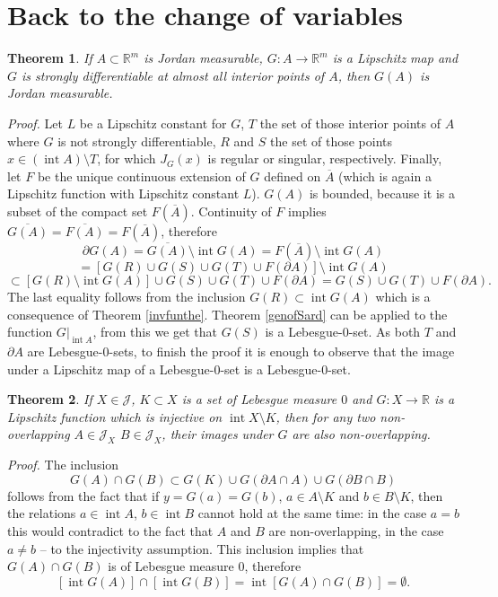 \documentclass{article}
\newcommand{\proof}[1]{\textit{Proof. }#1}
\newtheorem{theorem}{Theorem}
\newcommand{\ir}{\mathop{\mathrm{int}}\nolimits}
\newcommand{\R}{\ensuremath{\mathbb R}}
\newcommand{\J}{\mathscr{J}}
\newcommand{\ol}{\overline}
\begin{document}
\section{Back to the change of variables}

\begin{theorem} \label{imageJoLi}
If $ A\subset\R^m $ is Jordan measurable, $ G:A\to\R^m $ is a
Lipschitz map and $ G $ is strongly differentiable at almost all
interior points of $ A $, then $ G(A) $ is Jordan measurable.
\end{theorem}

\proof{ Let $ L $ be a Lipschitz constant for $ G $, $ T $ the set of
those interior points of $ A $ where $ G $ is not strongly
differentiable, $ R $ and $ S $ the set of those points $x\in(\ir
A)\setminus T $, for which $ J_G(x) $ is regular or singular,
respectively. Finally, let $F$ be the unique continuous extension
of $G$ defined on $ \ol{A}$ (which is again a Lipschitz function
with Lipschitz constant $ L $). $ G(A) $ is bounded, because it is
a subset of the compact set $ F(\ol{A}) $. Continuity of $ F $
implies $ \ol{G(A)}=\ol{F(A)}=F(\ol{A}) $, therefore
\[\partial G(A)=\ol{G(A)}\setminus\ir G(A)=
F(\ol{A})\setminus\ir G(A)\]
\[=\left[G(R)\cup G(S)\cup G(T)\cup F(\partial A)\right]\setminus\ir G(A)\]
\[\subset\left[G(R)\setminus\ir G(A)\right]\cup G(S)\cup G(T)\cup F(\partial A)=
G(S)\cup G(T)\cup F(\partial A).\] The last equality follows from
the inclusion $ G(R)\subset\ir G(A)$ which is a consequence of
Theorem \ref{invfunthe}. Theorem \ref{genofSard} can be applied to
the function $ G\vert_{\ir A} $, from this we get that $ G(S) $ is
a Lebesgue-$0$-set. As both $ T $ and $
\partial A $ are Lebesgue-$0$-sets, to finish the proof it is
enough to observe that the image under a Lipschitz map of a
Lebesgue-$ 0 $-set is a Lebesgue-$ 0 $-set.
}%

\begin{theorem}\label{nonoverl}
If $X\in\J$, $K\subset X$ is a set of Lebesgue measure $0$ and
$G\colon X\to \R$ is a Lipschitz function which is injective on
$\ir X\setminus K$, then for any two non-overlapping $A\in\J_X$
$B\in\J_X$, their images under $G$ are also non-overlapping.
\end{theorem}

\proof{ The inclusion
\[G(A)\cap G(B)\subset G(K)\cup G(\partial A\cap A)\cup
G(\partial B\cap B)\] follows from the fact that if $y=G(a)=G(b)$,
$a\in A\setminus K$ and $b\in B\setminus K$, then the relations
$a\in\ir A$, $b\in\ir B$ cannot hold at the same time: in the case
$a=b$ this would contradict to the fact that $A$ and $B$ are
non-overlapping, in the case $a\neq b$ -- to the injectivity
assumption. This inclusion implies that $G(A)\cap G(B)$ is of
Lebesgue measure $0$, therefore
\[[\ir G(A)]\cap[\ir G(B)]=\ir [G(A)\cap G(B)]=\emptyset.\]%
}%
\end{document}
